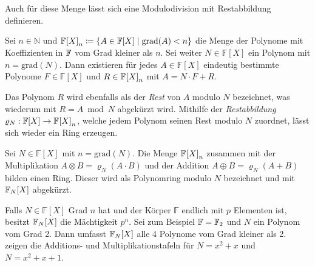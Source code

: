 Auch für diese Menge lässt sich eine Modulodivision mit Restabbildung definieren. 

\begin{satz}
    Sei $n\in \mathbb{N}$ und $\field{} {[X]}_n \coloneqq \{A \in \mathbb{F} {[X]} \mid \mathrm{grad}(A) < n\}$ die Menge der Polynome mit Koeffizienten in $\field{}$ vom Grad kleiner als $n$. Sei weiter $N \in \mathbb{F} {[X]}$ ein Polynom mit $n = \mathrm{grad}(N)$. Dann existieren für jedes $A \in \mathbb{F} {[X]}$ eindeutig bestimmte Polynome $F \in \mathbb{F} {[X]}$ und $R \in \field{} {[X]}_n$ mit $A = N \cdot F + R$.
\end{satz}


Das Polynom $R$ wird ebenfalls als der \emph{Rest} von $A$ modulo $N$ bezeichnet, was wiederum mit $R = A \bmod N$ abgekürzt wird. Mithilfe der \emph{Restabbildung} $\varrho_N : \mathbb{F} {[X]} \rightarrow \field{} {[X]}_n$, welche jedem Polynom seinen Rest modulo $N$ zuordnet, lässt sich wieder ein Ring erzeugen.

\begin{satz}
    Sei $N \in \mathbb{F} {[X]}$ mit $n = \mathrm{grad}(N)$. Die Menge $\field{} {[X]}_n$ zusammen mit der Multiplikation $A \otimes B = \varrho_N(A \cdot B)$ und der Addition $A \oplus B = \varrho_N(A + B)$ bilden einen Ring. Dieser wird als Polynomring modulo $N$ bezeichnet und mit $\field{N} {[X]}$ abgekürzt.
\end{satz}

Falls $N \in \mathbb{F} {[X]}$ Grad $n$ hat und der Körper $\mathbb{F}$ endlich mit $p$ Elementen ist, besitzt $\field{N} {[X]}$ die Mächtigkeit $p^n$.
Sei zum Beispiel $\mathbb{F} = \field{2}$ und $N$ ein Polynom vom Grad 2. Dann umfasst $\field{N} {[X]}$ alle 4 Polynome vom Grad kleiner als 2.  zeigen die Additions- und Multiplikationstafeln für $N=x^2 + x$ und $N= x^2 + x + 1$.

